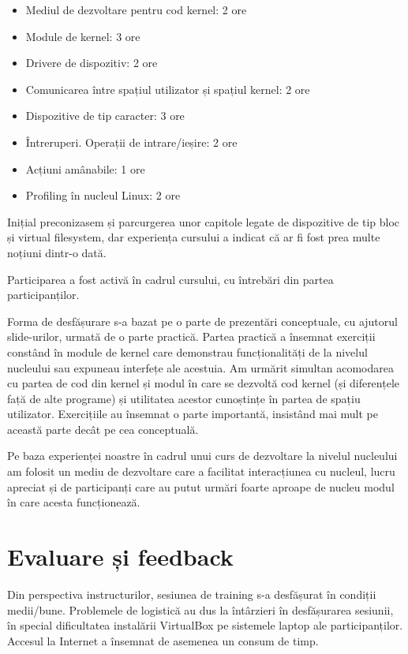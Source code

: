 \documentclass[12pt]{article}
\begin{document}
\begin{itemize}
  \item Mediul de dezvoltare pentru cod kernel: 2 ore
  \item Module de kernel: 3 ore
  \item Drivere de dispozitiv: 2 ore
  \item Comunicarea între spațiul utilizator și spațiul kernel: 2 ore
  \item Dispozitive de tip caracter: 3 ore
  \item Întreruperi. Operații de intrare/ieșire: 2 ore
  \item Acțiuni amânabile: 1 ore
  \item Profiling în nucleul Linux: 2 ore
\end{itemize}

Inițial preconizasem și parcurgerea unor capitole legate de dispozitive de tip bloc și virtual filesystem, dar experiența cursului a indicat că ar fi fost prea multe noțiuni dintr-o dată.

Participarea a fost activă în cadrul cursului, cu întrebări din partea participanților.

Forma de desfășurare s-a bazat pe o parte de prezentări conceptuale, cu ajutorul slide-urilor, urmată de o parte practică. Partea practică a însemnat exerciții constând în module de kernel care demonstrau funcționalități de la nivelul nucleului sau expuneau interfețe ale acestuia. Am urmărit simultan acomodarea cu partea de cod din kernel și modul în care se dezvoltă cod kernel (și diferențele față de alte programe) și utilitatea acestor cunoștințe în partea de spațiu utilizator. Exercițiile au însemnat o parte importantă, insistând mai mult pe această parte decât pe cea conceptuală.

Pe baza experienței noastre în cadrul unui curs de dezvoltare la nivelul nucleului am folosit un mediu de dezvoltare care a facilitat interacțiunea cu nucleul, lucru apreciat și de participanți care au putut urmări foarte aproape de nucleu modul în care acesta funcționează.

\section{Evaluare și feedback}

Din perspectiva instructurilor, sesiunea de training s-a desfășurat în condiții medii/bune. Problemele de logistică au dus la întârzieri în desfășurarea sesiunii, în special dificultatea instalării VirtualBox pe sistemele laptop ale participanților. Accesul la Internet a însemnat de asemenea un consum de timp.
\end{document}
